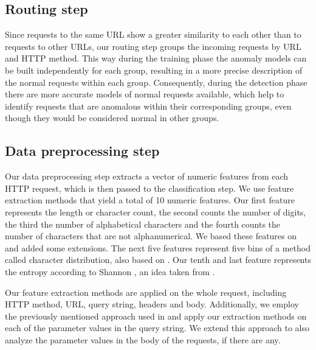 \subsection{Routing step}

Since requests to the same URL show a greater similarity to each other
than to requests to other URLs, our routing step groups the incoming
requests by URL and HTTP method. This way during the training phase the
anomaly models can be built independently for each group, resulting in a
more precise description of the normal requests within each group.
Consequently, during the detection phase there are more accurate models of
normal requests available, which help to identify requests that are
anomalous within their corresponding groups, even though they would be
considered normal in other groups.


\subsection{Data preprocessing step}

Our data preprocessing step extracts a vector of numeric features from
each HTTP request, which is then passed to the classification step.
We use feature extraction methods that yield a total of 10 numeric features.
Our first feature represents the length or character count, the second
counts the number of digits, the third the number of alphabetical
characters and the fourth counts the number of characters that are not
alphanumerical. We based these features on \cite{kruegel2003anomaly} and
added some extensions.
The next five features represent five bins of a method called character
distribution, also based on \cite{kruegel2003anomaly}.
Our tenth and last feature represents the entropy according to Shannon
\cite{encyMathEntropy}, an idea taken from \cite{nguyen2011application}.

Our feature extraction methods are applied on the whole request,
including HTTP method, URL, query string, headers and body.
Additionally, we employ the previously mentioned approach used in
\cite{kruegel2003anomaly} and apply our extraction methods on each of the
parameter values in the query string. We extend this approach to also
analyze the parameter values in the body of the requests, if there are any.

